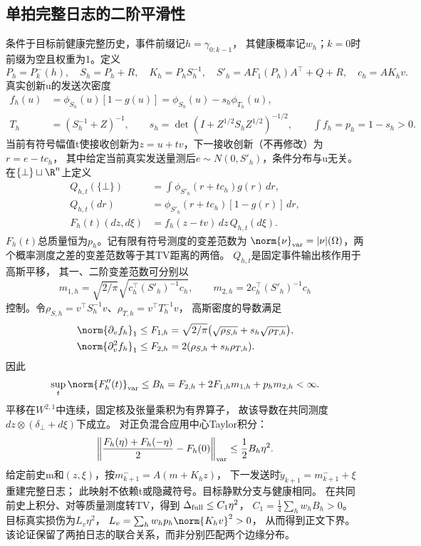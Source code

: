 \subsection{单拍完整日志的二阶平滑性}
条件于目标前健康完整历史，事件前缀记$h=\gamma_{0:k-1}$，
其健康概率记$w_h$；$k=0$时前缀为空且权重为1。定义
\[
P_h=P_k^-(h),\quad S_h=P_h+R,\quad K_h=P_hS_h^{-1},\quad
S'_h=AF_1(P_h)A^\top+Q+R,\quad c_h=AK_hv.
\]
真实创新u的发送次密度
\begin{align*}
f_h(u)&=\phi_{S_h}(u)[1-g(u)]
=\phi_{S_h}(u)-s_h\phi_{T_h}(u),\\
T_h&=(S_h^{-1}+Z)^{-1},\qquad
s_h=\det(I+Z^{1/2}S_hZ^{1/2})^{-1/2},\qquad
\int f_h=p_h=1-s_h>0.
\end{align*}
当前有符号幅值t使接收创新为$z=u+tv$，下一接收创新（不再修改）为$r=e-tc_h$，
其中给定当前真实发送量测后$e\sim N(0,S'_h)$，条件分布与u无关。
在$\{\bot\}\sqcup\R^n$上定义
\begin{align*}
Q_{h,t}(\{\bot\})&=\int\phi_{S'_h}(r+tc_h)g(r)\,dr,\\
Q_{h,t}(dr)&=\phi_{S'_h}(r+tc_h)[1-g(r)]\,dr,\\
F_h(t)(dz,d\xi)&=f_h(z-tv)\,dz\,Q_{h,t}(d\xi).
\end{align*}
$F_h(t)$总质量恒为$p_h$。记有限有符号测度的变差范数为
$\norm{\nu}_{\rm var}=|\nu|(\Omega)$，两个概率测度之差的变差范数等于其TV距离的两倍。
$Q_{h,t}$是固定事件输出核作用于高斯平移，
其一、二阶变差范数可分别以
\[
m_{1,h}=\sqrt{2/\pi}\sqrt{c_h^\top(S'_h)^{-1}c_h},\qquad
m_{2,h}=2c_h^\top(S'_h)^{-1}c_h
\]
控制。令$\rho_{S,h}=v^\top S_h^{-1}v$、$\rho_{T,h}=v^\top T_h^{-1}v$，
高斯密度的导数满足
\begin{align*}
\norm{\partial_vf_h}_1&\le F_{1,h}
=\sqrt{2/\pi}\bigl(\sqrt{\rho_{S,h}}+s_h\sqrt{\rho_{T,h}}\bigr),\\
\norm{\partial_v^2f_h}_1&\le F_{2,h}=2(\rho_{S,h}+s_h\rho_{T,h}).
\end{align*}
因此
\[
\sup_t\norm{F_h''(t)}_{\rm var}
\le B_h=F_{2,h}+2F_{1,h}m_{1,h}+p_hm_{2,h}<\infty.
\]
平移在$W^{2,1}$中连续，固定核及张量乘积为有界算子，
故该导数在共同测度$dz\otimes(\delta_\bot+d\xi)$下成立。
对正负混合应用中心Taylor积分：
\[
\left\|\frac{F_h(\eta)+F_h(-\eta)}2-F_h(0)\right\|_{\rm var}
\le\frac12B_h\eta^2.
\]
给定前史m和$(z,\xi)$，按$m_{k+1}^-=A(m+K_hz)$，
下一发送时$\tilde y_{k+1}=m_{k+1}^-+\xi$重建完整日志；
此映射不依赖t或隐藏符号。目标静默分支与健康相同。
在共同前史上积分、对等质量测度转TV，得到
$\Delta_{\rm full}\le C_1\eta^2$，
$C_1=\frac14\sum_hw_hB_h>0$。
目标真实损伤为$L_v\eta^2$，
$L_v=\sum_hw_hp_h\norm{K_hv}^2>0$，
从而得到正文下界。该论证保留了两拍日志的联合关系，而非分别匹配两个边缘分布。

